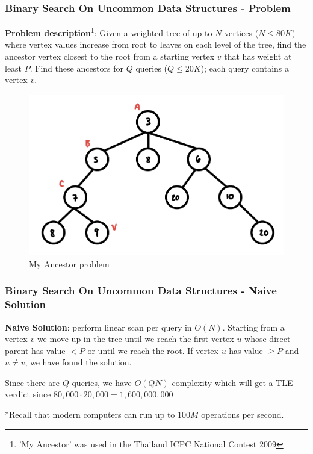 \documentclass{beamer}
\begin{document}
\begin{frame}[fragile]
\frametitle{Binary Search On Uncommon Data Structures - Problem}

\textbf{Problem description}\footnote{'My Ancestor' was used in the Thailand ICPC National Contest 2009}: Given a weighted tree of up to $N$ vertices ($N \leq 80K$) where vertex values increase from root to leaves on each level of the tree, find the ancestor vertex closest to the root from a starting vertex $v$ that has weight at least $P$. Find these ancestors for $Q$ queries ($Q \leq 20K$); each query contains a vertex $v$.

\begin{figure}
    \centering
    \includegraphics[scale=0.15]{imgs/my_ancestor.jpeg}
    \caption{My Ancestor problem}
\end{figure}

\end{frame}

\begin{frame}[fragile]
\frametitle{Binary Search On Uncommon Data Structures - Naive Solution}

\textbf{Naive Solution}: perform linear scan per query in $O(N)$. Starting from a vertex $v$ we move up in the tree until we reach the first vertex $u$ whose direct parent has value $< P$ or until we reach the root. If vertex $u$ has value $\geq P$ and $u \neq v$, we have found the solution. \\ \vspace{0.3cm}

Since there are $Q$ queries, we have $O(QN)$ complexity which will get a TLE verdict since $80,000\cdot20,000 = 1,600,000,000$ \\ \vspace{0.3cm}

\color{blue}*Recall that modern computers can run up to $100M$ operations per second.\color{black}

\end{frame}
\end{document}
